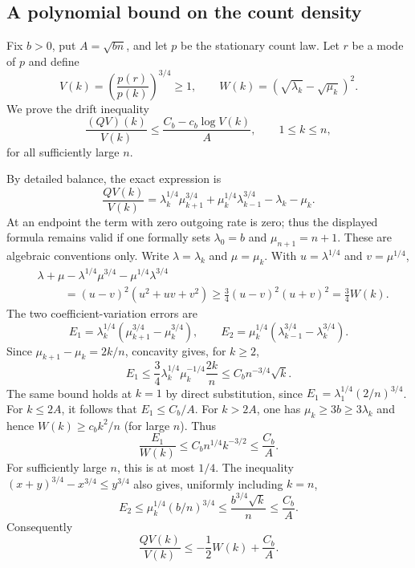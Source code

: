 \subsection{A polynomial bound on the count density}
Fix $b>0$, put $A=\sqrt{bn}$, and let $p$ be the stationary count law.
Let $r$ be a mode of $p$ and define
\[
 V(k)=\left(\frac{p(r)}{p(k)}\right)^{3/4}\geq1,
 \qquad W(k)=(\sqrt{\lambda_k}-\sqrt{\mu_k})^2.
\]
We prove the drift inequality
\begin{equation}\label{eq:count-log-lyapunov-new}
 \frac{(QV)(k)}{V(k)}
 \leq\frac{C_b-c_b\log V(k)}{A},\qquad 1\leq k\leq n,
\end{equation}
for all sufficiently large $n$.

By detailed balance, the exact expression is
\[
 \frac{QV(k)}{V(k)}
 =\lambda_k^{1/4}\mu_{k+1}^{3/4}
  +\mu_k^{1/4}\lambda_{k-1}^{3/4}-\lambda_k-\mu_k.
\]
At an endpoint the term with zero outgoing rate is zero; thus the displayed
formula remains valid if one formally sets $\lambda_0=b$ and
$\mu_{n+1}=n+1$. These are algebraic conventions only.
Write $\lambda=\lambda_k$ and $\mu=\mu_k$. With
$u=\lambda^{1/4}$ and $v=\mu^{1/4}$,
\begin{align*}
 &\lambda+\mu-\lambda^{1/4}\mu^{3/4}-\mu^{1/4}\lambda^{3/4}\\
 &\hspace{1cm}=(u-v)^2(u^2+uv+v^2)
 \geq\frac34(u-v)^2(u+v)^2
 =\frac34W(k).
\end{align*}
The two coefficient-variation errors are
\[
 E_1=\lambda_k^{1/4}(\mu_{k+1}^{3/4}-\mu_k^{3/4}),\qquad
 E_2=\mu_k^{1/4}(\lambda_{k-1}^{3/4}-\lambda_k^{3/4}).
\]
Since $\mu_{k+1}-\mu_k=2k/n$, concavity gives, for $k\geq2$,
\[
 E_1\leq\frac34\lambda_k^{1/4}\mu_k^{-1/4}\frac{2k}{n}
       \leq C_b n^{-3/4}\sqrt k.
\]
The same bound holds at $k=1$ by direct substitution, since
$E_1=\lambda_1^{1/4}(2/n)^{3/4}$.
For $k\leq2A$, it follows that $E_1\leq C_b/A$.
For $k>2A$, one has $\mu_k\geq3b\geq3\lambda_k$ and hence
$W(k)\geq c_bk^2/n$ (for large $n$). Thus
\[
 \frac{E_1}{W(k)}\leq C_bn^{1/4}k^{-3/2}\leq\frac{C_b}{A}.
\]
For sufficiently large $n$, this is at most $1/4$.
The inequality $(x+y)^{3/4}-x^{3/4}\leq y^{3/4}$ also gives, uniformly
including $k=n$,
\[
 E_2\leq\mu_k^{1/4}(b/n)^{3/4}
 \leq\frac{b^{3/4}\sqrt k}{n}\leq\frac{C_b}{A}.
\]
Consequently
\begin{equation}\label{eq:count-drift-square-new}
 \frac{QV(k)}{V(k)}\leq-\frac12W(k)+\frac{C_b}{A}.
\end{equation}

